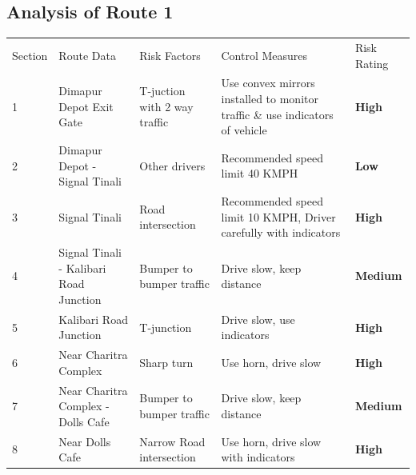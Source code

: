 \documentclass[paper=letter, fontsize=12pt]{article}
\begin{document}
\subsection{Analysis of Route 1}

\begin{tabular}{ |p{0.5cm}|p{2.5cm}|p{2cm}|p{3cm}|p{1cm}|  }
\hline
\rowcolor{lightgray} \multicolumn{5}{|c|}{Route Analysis} \\
\hline
Section& Route Data &Risk Factors & Control Measures& Risk Rating \\
\hline
1 & Dimapur Depot Exit Gate & T-juction with 2 way traffic& Use convex mirrors installed to monitor traffic \& use indicators of vehicle& \cellcolor[HTML]{FF0000} \textbf{High}\\
\hline

2 & Dimapur Depot - Signal Tinali & Other drivers & Recommended speed limit 40 KMPH& \cellcolor[HTML]{00CC00} \textbf{Low}\\
\hline

3 & Signal Tinali & Road intersection & Recommended speed limit 10 KMPH, Driver carefully with indicators& \cellcolor[HTML]{FF0000} \textbf{High}\\
\hline

4 & Signal Tinali - Kalibari Road Junction & Bumper to bumper traffic & Drive slow, keep distance& \cellcolor[HTML]{FFCC00} \textbf{Medium}\\
\hline

5 & Kalibari Road Junction & T-junction & Drive slow, use indicators& \cellcolor[HTML]{FF0000} \textbf{High}\\
\hline

6 & Near Charitra Complex & Sharp turn & Use horn, drive slow& \cellcolor[HTML]{FF0000} \textbf{High}\\
\hline

7 & Near Charitra Complex - Dolls Cafe & Bumper to bumper traffic & Drive slow, keep distance& \cellcolor[HTML]{FFCC00} \textbf{Medium}\\
\hline

8 & Near Dolls Cafe & Narrow Road intersection & Use horn, drive slow with indicators& \cellcolor[HTML]{FF0000} \textbf{High}\\
\hline




\hline
\end{tabular}
\end{document}
